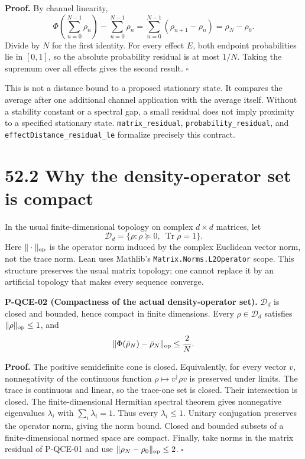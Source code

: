 \documentclass[
  11pt,
  oneside]{book}
\begin{document}
\textbf{Proof.} By channel linearity, \[
\Phi\left(\sum_{n=0}^{N-1}\rho_n\right)-\sum_{n=0}^{N-1}\rho_n
=\sum_{n=0}^{N-1}(\rho_{n+1}-\rho_n)=\rho_N-\rho_0.
\] Divide by \(N\) for the first identity. For every effect \(E\), both
endpoint probabilities lie in \([0,1]\), so the absolute probability
residual is at most \(1/N\). Taking the supremum over all effects gives
the second result. \(\square\)

This is not a distance bound to a proposed stationary state. It compares
the average after one additional channel application with the average
itself. Without a stability constant or a spectral gap, a small residual
does not imply proximity to a specified stationary state.
\texttt{matrix\_\allowbreak residual}, \texttt{probability\_\allowbreak residual}, and
\texttt{effect\allowbreak Distance\_\allowbreak residual\_\allowbreak le} formalize precisely this contract.

\section{52.2 Why the density-operator set is compact}

In the usual finite-dimensional topology on complex \(d\times d\)
matrices, let \[
\mathcal D_d=\{\rho:\rho\succeq0,\ \operatorname{Tr}\rho=1\}.
\] Here \(\|\cdot\|_{\rm op}\) is the operator norm induced by the
complex Euclidean vector norm, not the trace norm. Lean uses Mathlib's
\texttt{Matrix.\allowbreak Norms.\allowbreak L2\allowbreak Operator} scope. This structure preserves the
usual matrix topology; one cannot replace it by an artificial topology
that makes every sequence converge.

\label{p-qce-02}{}

\textbf{P-QCE-02 (Compactness of the actual density-operator set).}
\(\mathcal D_d\) is closed and bounded, hence compact in finite
dimensions. Every \(\rho\in\mathcal D_d\) satisfies
\(\|\rho\|_{\rm op}\le1\), and \[
\|\Phi(\bar\rho_N)-\bar\rho_N\|_{\rm op}\le\frac2N.
\]

\textbf{Proof.} The positive semidefinite cone is closed. Equivalently,
for every vector \(v\), nonnegativity of the continuous function
\(\rho\mapsto v^\dagger\rho v\) is preserved under limits. The trace is
continuous and linear, so the trace-one set is closed. Their
intersection is closed. The finite-dimensional Hermitian spectral
theorem gives nonnegative eigenvalues \(\lambda_i\) with
\(\sum_i\lambda_i=1\). Thus every \(\lambda_i\le1\). Unitary conjugation
preserves the operator norm, giving the norm bound. Closed and bounded
subsets of a finite-dimensional normed space are compact. Finally, take
norms in the matrix residual of P-QCE-01 and use
\(\|\rho_N-\rho_0\|_{\rm op}\le2\). \(\square\)
\end{document}
